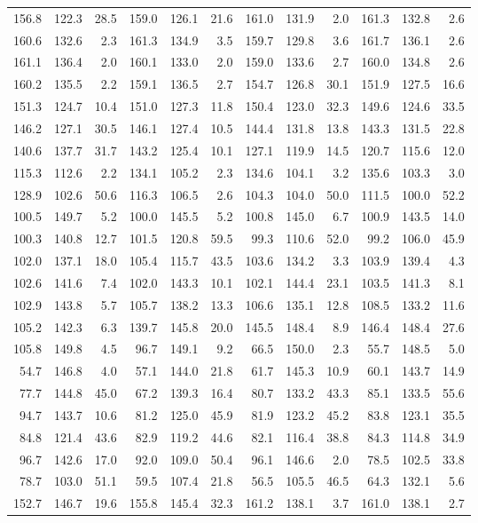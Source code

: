 \documentclass[draft]{article}
\begin{document}
\begin{center}
\begin{tabular}{rrrrrrrrrrrr}
156.8&122.3& 28.5&159.0&126.1& 21.6&161.0&131.9&  2.0&161.3&132.8&  2.6\\
160.6&132.6&  2.3&161.3&134.9&  3.5&159.7&129.8&  3.6&161.7&136.1&  2.6\\
161.1&136.4&  2.0&160.1&133.0&  2.0&159.0&133.6&  2.7&160.0&134.8&  2.6\\
160.2&135.5&  2.2&159.1&136.5&  2.7&154.7&126.8& 30.1&151.9&127.5& 16.6\\
151.3&124.7& 10.4&151.0&127.3& 11.8&150.4&123.0& 32.3&149.6&124.6& 33.5\\
146.2&127.1& 30.5&146.1&127.4& 10.5&144.4&131.8& 13.8&143.3&131.5& 22.8\\
140.6&137.7& 31.7&143.2&125.4& 10.1&127.1&119.9& 14.5&120.7&115.6& 12.0\\
115.3&112.6&  2.2&134.1&105.2&  2.3&134.6&104.1&  3.2&135.6&103.3&  3.0\\
128.9&102.6& 50.6&116.3&106.5&  2.6&104.3&104.0& 50.0&111.5&100.0& 52.2\\
100.5&149.7&  5.2&100.0&145.5&  5.2&100.8&145.0&  6.7&100.9&143.5& 14.0\\
100.3&140.8& 12.7&101.5&120.8& 59.5& 99.3&110.6& 52.0& 99.2&106.0& 45.9\\
102.0&137.1& 18.0&105.4&115.7& 43.5&103.6&134.2&  3.3&103.9&139.4&  4.3\\
102.6&141.6&  7.4&102.0&143.3& 10.1&102.1&144.4& 23.1&103.5&141.3&  8.1\\
102.9&143.8&  5.7&105.7&138.2& 13.3&106.6&135.1& 12.8&108.5&133.2& 11.6\\
105.2&142.3&  6.3&139.7&145.8& 20.0&145.5&148.4&  8.9&146.4&148.4& 27.6\\
105.8&149.8&  4.5& 96.7&149.1&  9.2& 66.5&150.0&  2.3& 55.7&148.5&  5.0\\
 54.7&146.8&  4.0& 57.1&144.0& 21.8& 61.7&145.3& 10.9& 60.1&143.7& 14.9\\
 77.7&144.8& 45.0& 67.2&139.3& 16.4& 80.7&133.2& 43.3& 85.1&133.5& 55.6\\
 94.7&143.7& 10.6& 81.2&125.0& 45.9& 81.9&123.2& 45.2& 83.8&123.1& 35.5\\
 84.8&121.4& 43.6& 82.9&119.2& 44.6& 82.1&116.4& 38.8& 84.3&114.8& 34.9\\
 96.7&142.6& 17.0& 92.0&109.0& 50.4& 96.1&146.6&  2.0& 78.5&102.5& 33.8\\
 78.7&103.0& 51.1& 59.5&107.4& 21.8& 56.5&105.5& 46.5& 64.3&132.1&  5.6\\
152.7&146.7& 19.6&155.8&145.4& 32.3&161.2&138.1&  3.7&161.0&138.1&  2.7\\

\end{tabular}
\end{center}
\end{document}
